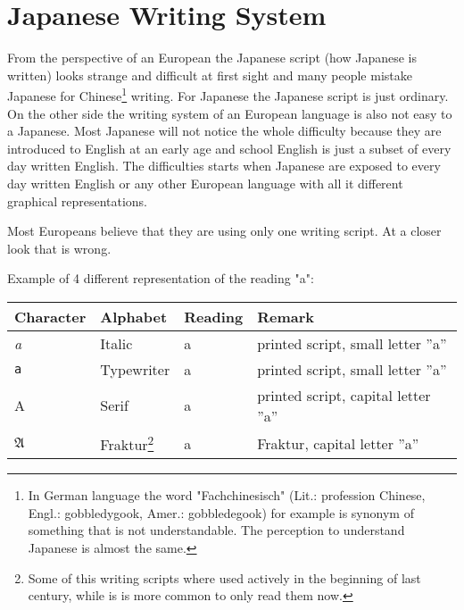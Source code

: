 \chapter{Japanese Writing System}
\label{chap:JapaneseWritingSystem}


From the perspective of an European the Japanese script (how Japanese is
written) looks strange and difficult at first sight and many people mistake
Japanese for Chinese\footnote{In German language the word "Fachchinesisch"
(Lit.: profession Chinese, Engl.: gobbledygook, Amer.: gobbledegook) for
example is synonym of something that is not understandable. The perception to
understand Japanese is almost the same.} writing. For Japanese the Japanese
script is just ordinary. On the other side the writing system of an European
language is also not easy to a Japanese. Most Japanese will not notice the
whole difficulty because they are introduced to English at an early age and
school English is just a subset of every day written English. The difficulties
starts when Japanese are exposed to every day written English or any other
European language with all it different graphical representations.

Most Europeans believe that they are using only one writing script. At a closer
look that is wrong.

\bigskip Example of 4 different representation of the reading "a":

\begin{center}
\begin{tabular}{|l|l|l|l|}
\textbf{Character}&\textbf{Alphabet}&\textbf{Reading}&\textbf{Remark}\\\hline
\textit{a}     &  Italic        & a & printed script, small letter ''a'' \\ 
\texttt{a}     &  Typewriter    & a & printed script, small letter ''a'' \\ 
A              &  Serif         & a & printed script, capital letter ''a'' \\ 
$\mathfrak{A}$ & Fraktur\footnote{Some of this writing scripts where used 
actively in the beginning of last century, while is is more common to only 
read them now.}& a & Fraktur, capital letter ''a''  \\ 
\end{tabular}
\end{center}

